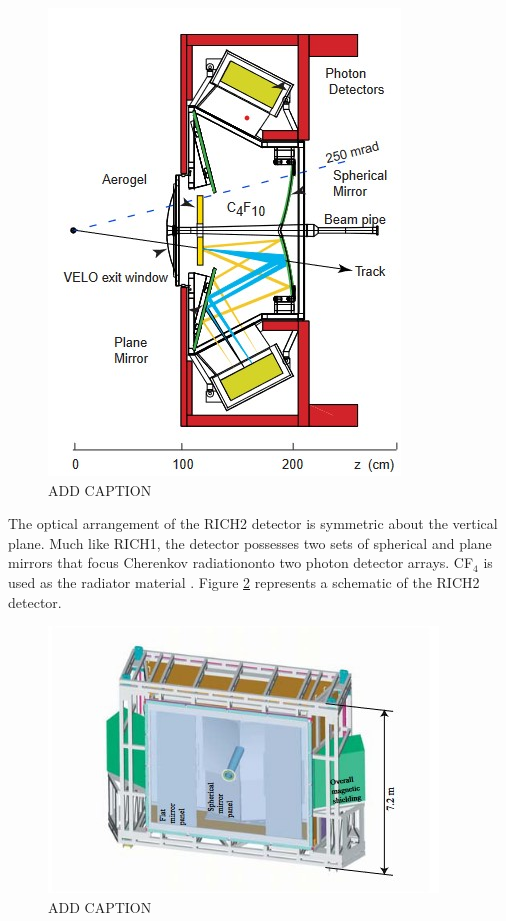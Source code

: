 \begin{figure}[H]
    \centering
    \includegraphics[scale=0.8]{RICH1Layout.jpg}
    \caption{ADD CAPTION}
    \label{RICH1Layout}
\end{figure}
The optical arrangement of the RICH2 detector is symmetric about the vertical plane. Much like RICH1, the detector possesses two sets of spherical and plane mirrors that focus Cherenkov radiationonto two photon detector arrays. CF$_{4}$ is used as the radiator material \cite{Harnew:2008zz}. Figure \ref{RICH2Layout} represents a schematic of the RICH2 detector.
\begin{figure}[H]
    \centering
    \includegraphics{RICH2Layout.jpg}
    \caption{ADD CAPTION}
    \label{RICH2Layout}
\end{figure}
